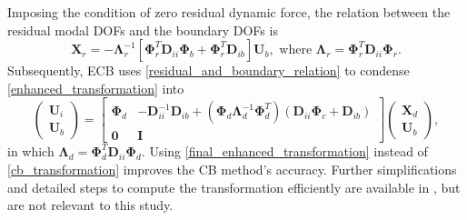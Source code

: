 {Imposing the condition of zero residual dynamic force, the relation between the residual modal DOFs and the boundary DOFs is}%
\begin{equation}
    \mathbf{X}_{r}
    =
    -\mathbf{\Lambda}_{r}^{-1}
    \left[
        \mathbf{\Phi}_{r}^{T}
        \mathbf{D}_{ii}
        \mathbf{\Phi}_{b}
    +
        \mathbf{\Phi}_{r}^{T}
        \mathbf{D}_{ib}
    \right]
    \mathbf{U}_{b},
    \text{ where }
    \mathbf{\Lambda}_{r}
    =
    \mathbf{\Phi}_{r}^{T}
    \mathbf{D}_{ii}
    \mathbf{\Phi}_{r}.
    \label{residual_and_boundary_relation}
\end{equation}
{Subsequently, ECB uses \eqref{residual_and_boundary_relation} to condense \eqref{enhanced_transformation} into}%
\begin{equation}
    \begin{pmatrix}
        \mathbf{U}_{i} \\
        \mathbf{U}_{b}
    \end{pmatrix}
    =
    \begin{bmatrix}
        \mathbf{\Phi}_{d} &
        -\mathbf{D}_{ii}^{-1} \mathbf{D}_{ib}
        +
        \left(
            \mathbf{\Phi}_{d}
            \mathbf{\Lambda}_{d}^{-1}
            \mathbf{\Phi}_{d}^{T}
        \right)
        \left(
            \mathbf{D}_{ii}
            \mathbf{\Phi}_{c}
            +
            \mathbf{D}_{ib}
        \right)
        \\
        \mathbf{0}
        &
        \mathbf{I}
    \end{bmatrix}
    \begin{pmatrix}
        \mathbf{X}_{d} \\
        \mathbf{U}_{b}
    \end{pmatrix},
    \label{final_enhanced_transformation}
\end{equation}
in which $
    \mathbf{\Lambda}_{d}
    =
    \mathbf{\Phi}_{d}^{T}
    \mathbf{D}_{ii}
    \mathbf{\Phi}_{d}
$.
Using \eqref{final_enhanced_transformation} instead of \eqref{cb_transformation} improves the CB method's accuracy.
Further simplifications and detailed steps to compute the transformation efficiently are available in \cite{kim2015enhanced}, but are not relevant to this study.